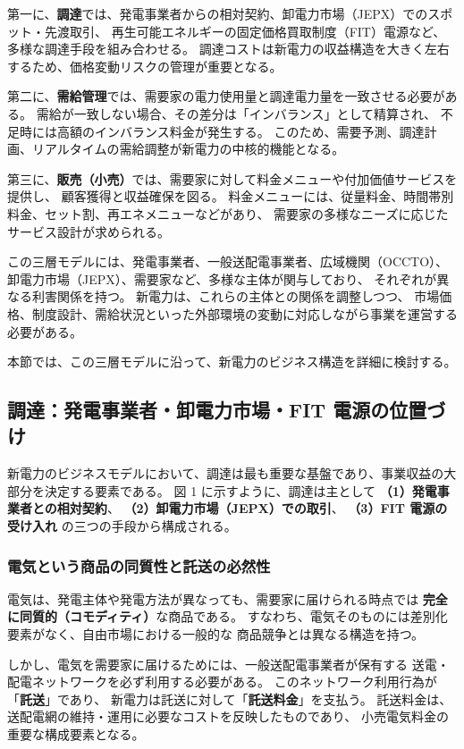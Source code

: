 第一に、\textbf{調達}では、発電事業者からの相対契約、卸電力市場（JEPX）でのスポット・先渡取引、
再生可能エネルギーの固定価格買取制度（FIT）電源など、多様な調達手段を組み合わせる。
調達コストは新電力の収益構造を大きく左右するため、価格変動リスクの管理が重要となる。

第二に、\textbf{需給管理}では、需要家の電力使用量と調達電力量を一致させる必要がある。
需給が一致しない場合、その差分は「インバランス」として精算され、
不足時には高額のインバランス料金が発生する。
このため、需要予測、調達計画、リアルタイムの需給調整が新電力の中核的機能となる。

第三に、\textbf{販売（小売）}では、需要家に対して料金メニューや付加価値サービスを提供し、
顧客獲得と収益確保を図る。
料金メニューには、従量料金、時間帯別料金、セット割、再エネメニューなどがあり、
需要家の多様なニーズに応じたサービス設計が求められる。

この三層モデルには、発電事業者、一般送配電事業者、広域機関（OCCTO）、
卸電力市場（JEPX）、需要家など、多様な主体が関与しており、
それぞれが異なる利害関係を持つ。
新電力は、これらの主体との関係を調整しつつ、
市場価格、制度設計、需給状況といった外部環境の変動に対応しながら事業を運営する必要がある。

本節では、この三層モデルに沿って、新電力のビジネス構造を詳細に検討する。


\subsection{調達：発電事業者・卸電力市場・FIT 電源の位置づけ}

新電力のビジネスモデルにおいて、調達は最も重要な基盤であり、事業収益の大部分を決定する要素である。
図 1 に示すように、調達は主として
\textbf{（1）発電事業者との相対契約}、
\textbf{（2）卸電力市場（JEPX）での取引}、
\textbf{（3）FIT 電源の受け入れ}
の三つの手段から構成される。

\subsubsection{電気という商品の同質性と託送の必然性}

電気は、発電主体や発電方法が異なっても、需要家に届けられる時点では
\textbf{完全に同質的（コモディティ）}な商品である。
すなわち、電気そのものには差別化要素がなく、自由市場における一般的な
商品競争とは異なる構造を持つ。

しかし、電気を需要家に届けるためには、一般送配電事業者が保有する
送電・配電ネットワークを必ず利用する必要がある。
このネットワーク利用行為が「\textbf{託送}」であり、
新電力は託送に対して「\textbf{託送料金}」を支払う。
託送料金は、送配電網の維持・運用に必要なコストを反映したものであり、
小売電気料金の重要な構成要素となる。

